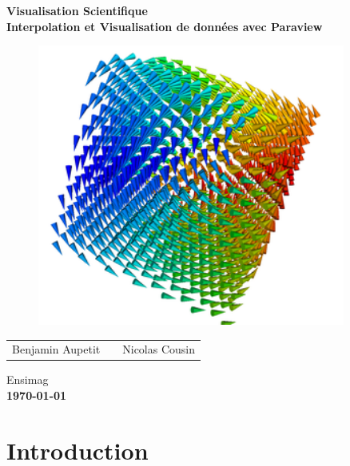 \documentclass[a4paper,9pt]{article}
\begin{document}
\begin{titlepage}
\centering
\huge
\bfseries
Visualisation Scientifique\\[1\baselineskip]
\vspace{0.5cm}
\normalfont
\large
Interpolation et Visualisation de données avec Paraview\\[1\baselineskip]
	
\vspace{2cm}

\begin{figure}[!h]
\centering
\includegraphics[width=0.9\textwidth]{couverture.png}
\end{figure}

\vspace{1.5cm}

\centering
\bfseries
\normalfont

\begin{tabular}{r c l}
Benjamin Aupetit & & Nicolas Cousin
\end{tabular}	

\vspace{0.5cm}

Ensimag\\
\textbf{\today}
\end{titlepage}

\clearpage
\newpage

\tableofcontents

\clearpage
\newpage


\section{Introduction}
\label{sec:introduction}
\end{document}
